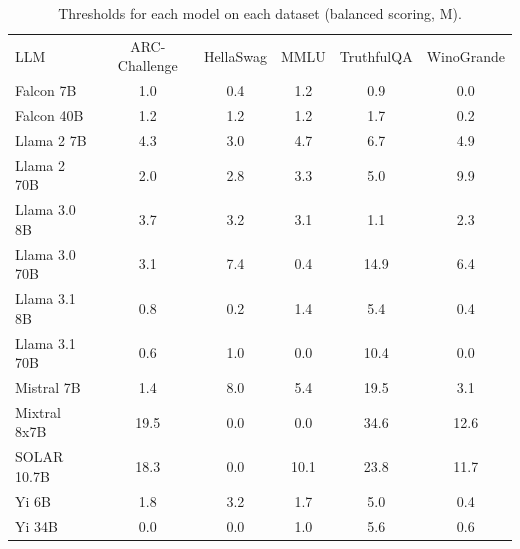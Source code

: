 \begin{table}[h]
\caption{Thresholds for each model on each dataset (balanced scoring, M). }
\label{tab:thresholds_logit_margin_k20_w1}
\centering
\begin{tabular}{l S[table-format=3.1] S[table-format=3.1] S[table-format=3.1] S[table-format=3.1] S[table-format=3.1]}
\toprule
LLM & ARC-Challenge & HellaSwag & MMLU & TruthfulQA & WinoGrande \\ 
\cmidrule(lr){1-1} \cmidrule(lr){2-2} \cmidrule(lr){3-3} \cmidrule(lr){4-4} \cmidrule(lr){5-5} \cmidrule(lr){6-6}
Falcon 7B & 1.0 & 0.4 & 1.2 & 0.9 & 0.0\\
Falcon 40B & 1.2 & 1.2 & 1.2 & 1.7 & 0.2\\
Llama 2 7B & 4.3 & 3.0 & 4.7 & 6.7 & 4.9\\
Llama 2 70B & 2.0 & 2.8 & 3.3 & 5.0 & 9.9\\
Llama 3.0 8B & 3.7 & 3.2 & 3.1 & 1.1 & 2.3\\
Llama 3.0 70B & 3.1 & 7.4 & 0.4 & 14.9 & 6.4\\
Llama 3.1 8B & 0.8 & 0.2 & 1.4 & 5.4 & 0.4\\
Llama 3.1 70B & 0.6 & 1.0 & 0.0 & 10.4 & 0.0\\
Mistral 7B & 1.4 & 8.0 & 5.4 & 19.5 & 3.1\\
Mixtral 8x7B & 19.5 & 0.0 & 0.0 & 34.6 & 12.6\\
SOLAR 10.7B & 18.3 & 0.0 & 10.1 & 23.8 & 11.7\\
Yi 6B & 1.8 & 3.2 & 1.7 & 5.0 & 0.4\\
Yi 34B & 0.0 & 0.0 & 1.0 & 5.6 & 0.6\\
\bottomrule
\end{tabular}
\end{table}
